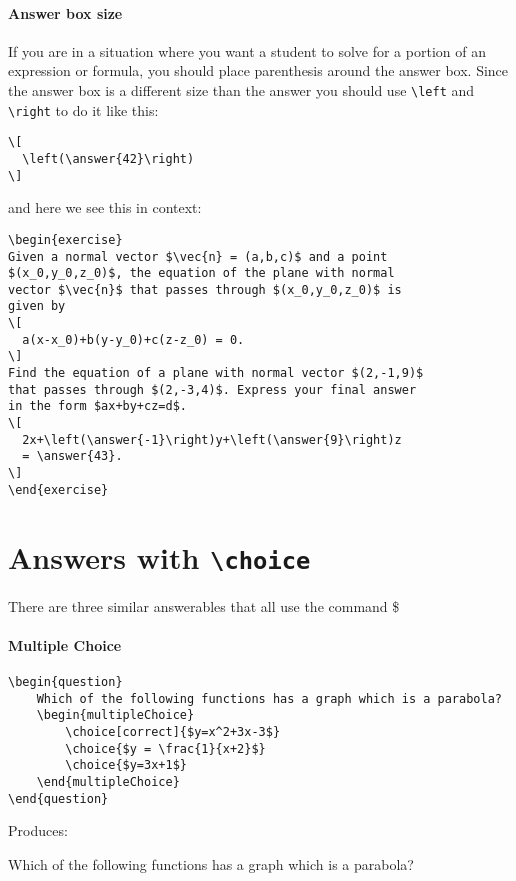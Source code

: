 \documentclass{ximera}
\begin{document}
\paragraph{Answer box size}
If you are in a situation where you want a student to solve for a portion
of an expression or formula, you should place parenthesis around the answer
box. Since the answer box is a different size than the answer you should use
\verb!\left! and \verb!\right! to do it like
this:
\begin{verbatim}
\[
  \left(\answer{42}\right)
\]
\end{verbatim}
and here we see this in context:
\begin{verbatim}
\begin{exercise}
Given a normal vector $\vec{n} = (a,b,c)$ and a point
$(x_0,y_0,z_0)$, the equation of the plane with normal
vector $\vec{n}$ that passes through $(x_0,y_0,z_0)$ is
given by
\[
  a(x-x_0)+b(y-y_0)+c(z-z_0) = 0.
\]
Find the equation of a plane with normal vector $(2,-1,9)$
that passes through $(2,-3,4)$. Express your final answer
in the form $ax+by+cz=d$.
\[
  2x+\left(\answer{-1}\right)y+\left(\answer{9}\right)z
  = \answer{43}.
\]
\end{exercise}
\end{verbatim}

\section{Answers with \texttt{\textbackslash choice}}

There are three similar answerables that all use the command \$

\paragraph{Multiple Choice}

\begin{verbatim}
\begin{question}
    Which of the following functions has a graph which is a parabola?
    \begin{multipleChoice}
        \choice[correct]{$y=x^2+3x-3$}
        \choice{$y = \frac{1}{x+2}$}
        \choice{$y=3x+1$}
    \end{multipleChoice}
\end{question}
\end{verbatim}

Produces:

\begin{question}
  Which of the following functions has a graph which is a parabola?
  \begin{multipleChoice}
  \end{multipleChoice}
\end{question}
\end{document}
